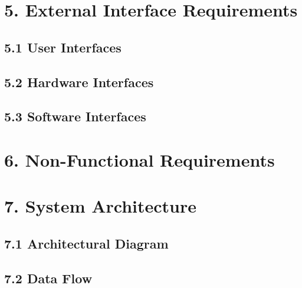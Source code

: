 \documentclass[a4paper,12pt]{report}
\begin{document}
\section{5. External Interface Requirements}
\subsection{5.1 User Interfaces}
\subsection{5.2 Hardware Interfaces}
\subsection{5.3 Software Interfaces}

\section{6. Non-Functional Requirements}

\section{7. System Architecture}
\subsection{7.1 Architectural Diagram}
\subsection{7.2 Data Flow}
\end{document}
